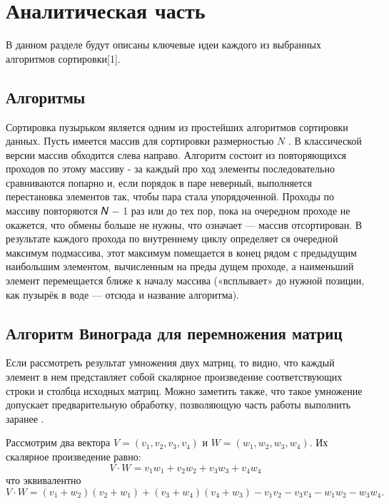 \chapter{Аналитическая часть}

В данном разделе будут описаны ключевые идеи каждого из вы­бранных алгоритмов сортировки[1].

\section{Алгоритмы}

Сортировка пузырьком является одним из простейших алгорит­мов сортировки данных.
Пусть имеется массив для сортировки размерностью $N$ .
В классической версии массив обходится слева направо. Алгоритм
состоит из повторяющихся проходов по этому массиву - за каждый про­
ход элементы последовательно сравниваются попарно и, если порядок
в паре неверный, выполняется перестановка элементов так, чтобы пара
стала упорядоченной.
Проходы по массиву повторяются 𝑁 − 1 раз или до тех пор, пока
на очередном проходе не окажется, что обмены больше не нужны, что
означает — массив отсортирован.
В результате каждого прохода по внутреннему циклу определяет­
ся очередной максимум подмассива, этот максимум помещается в конец
рядом с предыдущим наибольшим элементом, вычисленным на преды­
дущем проходе, а наименьший элемент перемещается ближе к началу
массива («всплывает» до нужной позиции, как пузырёк в воде — отсюда
и название алгоритма).

\section{Алгоритм Винограда для перемножения матриц}

Если рассмотреть результат умножения двух матриц, то видно, что каждый элемент в нем представляет собой скалярное произведение соответствующих строки и столбца исходных матриц.
Можно заметить также, что такое умножение допускает предварительную обработку, позволяющую часть работы выполнить заранее  \cite{win-book}. 

Рассмотрим два вектора $V = (v_1, v_2, v_3, v_4)$ и $W = (w_1, w_2, w_3, w_4)$. Их скалярное произведение равно:
\begin{equation}
	\label{eq:defmul}
	V \cdot W = v_1w_1 + v_2w_2 + v_3w_3 + v_4w_4
\end{equation}
что эквивалентно
\begin{equation}
	\label{eq:newmul}
		V \cdot W = (v_1 + w_2)(v_2 + w_1) + (v_3 + w_4)(v_4 + w_3) - v_1v_2 - v_3v_4 - w_1w_2 - w_3w_4.
\end{equation}

